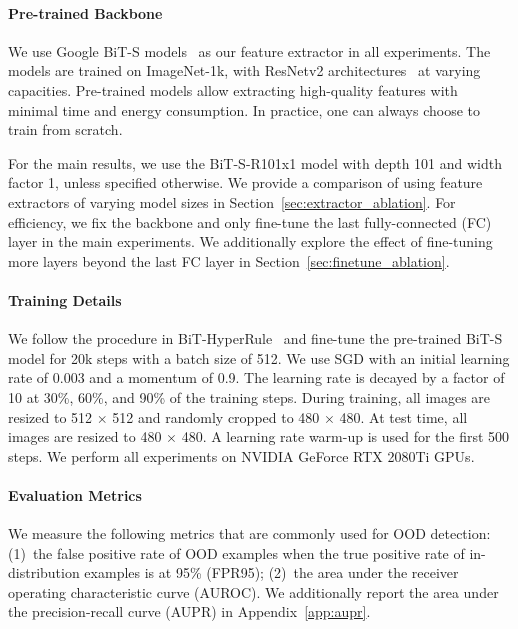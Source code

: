 \documentclass[final]{cvpr}
\begin{document}
\paragraph{Pre-trained Backbone} We use Google BiT-S models~\cite{kolesnikov2020big} as our feature extractor in all experiments. The models are trained on ImageNet-1k, with ResNetv2 architectures~\cite{he2016identity} at varying capacities.
Pre-trained models allow extracting high-quality features with minimal time and energy consumption. In practice, one can always choose to train from scratch.

For the main results, we use the BiT-S-R101x1 model with depth 101 and width factor 1, unless specified otherwise. We provide a comparison of using  feature extractors of varying model sizes in Section~\ref{sec:extractor_ablation}. For efficiency, we fix the backbone and only fine-tune the last fully-connected (FC) layer in the main experiments. We additionally explore the effect of fine-tuning more layers beyond the last FC layer in Section~\ref{sec:finetune_ablation}.

\vspace{-0.5cm}
\paragraph{Training Details} We follow the procedure in BiT-HyperRule~\cite{kolesnikov2020big} and fine-tune the pre-trained BiT-S model for 20k steps with a batch size of 512. We use SGD with an initial learning rate of 0.003 and a momentum of 0.9. The learning rate is decayed by a factor of 10 at 30\%, 60\%, and 90\% of the training steps. During training, all images are resized to 512 $\times$ 512 and randomly cropped to 480 $\times$ 480. At test time, all images are resized to 480 $\times$ 480. A learning rate warm-up is used for the first 500 steps. We perform all experiments on NVIDIA GeForce RTX 2080Ti GPUs.

\vspace{-0.5cm}
\paragraph{Evaluation Metrics} We measure the following metrics that are commonly used for OOD detection: (1)~the false positive rate of OOD examples when the true positive rate of in-distribution examples is at 95\% (FPR95); (2)~the area under the receiver operating characteristic curve (AUROC). We additionally report the area under the precision-recall curve (AUPR) in Appendix~\ref{app:aupr}.
\end{document}
